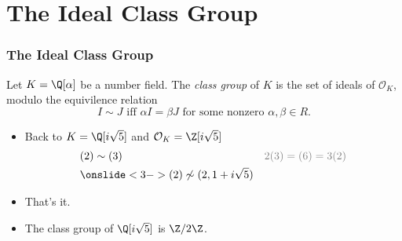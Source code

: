 \section{The Ideal Class Group}

\begin{frame}
	\frametitle{The Ideal Class Group}

	\begin{definition}
		Let $K = \Q[\alpha]$ be a number field. The \textit{class group} of $K$ is the set of ideals of $\mathcal O_K$, modulo the equivilence relation
		\begin{equation*}
			I \sim J \text{ iff } \alpha I = \beta J \text{ for some nonzero } \alpha, \beta \in R.
		\end{equation*}
	\end{definition}


	\medskip

	\begin{itemize}

		\item<2-> Back to $K = \Q[i \sqrt 5]$ and $\mathcal O_K = \Z[i \sqrt 5]$
			\begin{align*}
				 & (2) \sim (3)                                  & {\tiny \color{gray} 2 (3) = (6) = 3 (2)} \\
				 & \onslide<3->{(2) \not \sim (2, 1 + i \sqrt5)}
			\end{align*}
		\item<4-> That's it.
		\item<5-> The class group of $\Q[i \sqrt 5]$ is $\Z / 2 \Z$.
	\end{itemize}
\end{frame}

